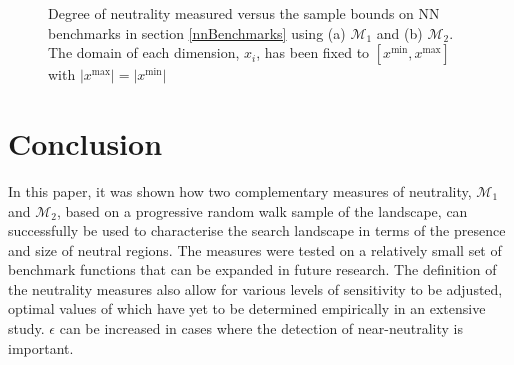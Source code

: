 \documentclass[conference]{IEEEtran}
\begin{document}
\begin{figure}[!t]
	\centering
	\label{figNNM1}	
	
	\label{figNNM2}	
	\caption{Degree of neutrality measured versus the sample bounds on NN benchmarks in section \ref{nnBenchmarks} using (a) ${\mathcal{M}_1}$ and (b) ${\mathcal{M}_2}$. The domain of each dimension, $x_i$, has been fixed to $[x^{\text{min}}, x^{\text{max}}]$ with $\lvert x^{\text{max}} \rvert = \lvert x^{\text{min}} \rvert$}
	\label{figNNNeutralityVsDomain}
\end{figure}

\section{Conclusion}
In this paper, it was shown how two complementary measures of neutrality, ${\mathcal{M}_1}$ and ${\mathcal{M}_2}$, based on a progressive random walk sample of the landscape, can successfully be used to characterise the search landscape in terms of the presence and size of neutral regions. The measures were tested on a relatively small set of benchmark functions that can be expanded in future research. The definition of the neutrality measures also allow for various levels of sensitivity to be adjusted, optimal values of which have yet to be determined empirically in an extensive study. $\epsilon$ can be increased in cases where the detection of near-neutrality is important. 
\end{document}
